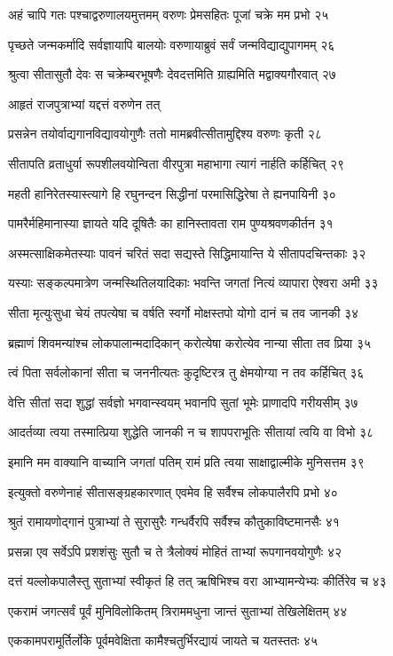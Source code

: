 अहं चापि गतः पश्चाद्वरुणालयमुत्तमम्
वरुणः प्रेमसहितः पूजां चक्रे मम प्रभो २५

पृच्छते जन्मकर्मादि सर्वज्ञायापि बालयोः
वरुणायाब्रुवं सर्वं जन्मविद्याद्युपागमम् २६

श्रुत्वा सीतासुतौ देवः स चक्रेम्बरभूषणैः
देवदत्तमिति ग्राह्यमिति मद्वाक्यगौरवात् २७

आहृतं राजपुत्राभ्यां यद्दत्तं वरुणेन तत्

प्रसन्नेन तयोर्वाद्यगानविद्यावयोगुणैः
ततो मामब्रवीत्सीतामुद्दिश्य वरुणः कृती २८

सीतापति व्रताधुर्या रूपशीलवयोन्विता
वीरपुत्रा महाभागा त्यागं नार्हति कर्हिचित् २९

महती हानिरेतस्यास्त्यागे हि रघुनन्दन
सिद्धीनां परमासिद्धिरेषा ते ह्यनपायिनी ३०

पामरैर्महिमानास्या ज्ञायते यदि दूषितैः
का हानिस्तावता राम पुण्यश्रवणकीर्तन ३१

अस्मत्साक्षिकमेतस्याः पावनं चरितं सदा
सद्यस्ते सिद्धिमायान्ति ये सीतापदचिन्तकाः ३२

यस्याः सङ्कल्पमात्रेण जन्मस्थितिलयादिकाः
भवन्ति जगतां नित्यं व्यापारा ऐश्वरा अमी ३३

सीता मृत्युःसुधा चेयं तपत्येषा च वर्षति
स्वर्गो मोक्षस्तपो योगो दानं च तव जानकी ३४

ब्रह्माणं शिवमन्यांश्च लोकपालान्मदादिकान्
करोत्येषा करोत्येव नान्या सीता तव प्रिया ३५

त्वं पिता सर्वलोकानां सीता च जननीत्यतः
कुदृष्टिरत्र तु क्षेमयोग्या न तव कर्हिचित् ३६

वेत्ति सीतां सदा शुद्धां सर्वज्ञो भगवान्स्वयम्
भवानपि सुतां भूमेः प्राणादपि गरीयसीम् ३७

आदर्तव्या त्वया तस्मात्प्रिया शुद्धेति जानकी
न च शापपराभूतिः सीतायां त्वयि वा विभो ३८

इमानि मम वाक्यानि वाच्यानि जगतां पतिम्
रामं प्रति त्वया साक्षाद्वाल्मीके मुनिसत्तम ३९

इत्युक्तो वरुणेनाहं सीतासङ्ग्रहकारणात्
एवमेव हि सर्वैश्च लोकपालैरपि प्रभो ४०

श्रुतं रामायणोद्गानं पुत्राभ्यां ते सुरासुरैः
गन्धर्वैरपि सर्वैश्च कौतुकाविष्टमानसैः ४१

प्रसन्ना एव सर्वेऽपि प्रशशंसुः सुतौ च ते
त्रैलोक्यं मोहितं ताभ्यां रूपगानवयोगुणैः ४२

दत्तं यल्लोकपालैस्तु सुताभ्यां स्वीकृतं हि तत्
ऋषिभिश्च वरा आभ्यामन्येभ्यः कीर्तिरेव च ४३

एकरामं जगत्सर्वं पूर्वं मुनिविलोकितम्
त्रिराममधुना जान्तं सुताभ्यां तेखिलेक्षितम् ४४

एककामपरामूर्तिर्लोके पूर्वमवेक्षिता
कामैश्चतुर्भिरद्यायं जायते च यतस्ततः ४५

